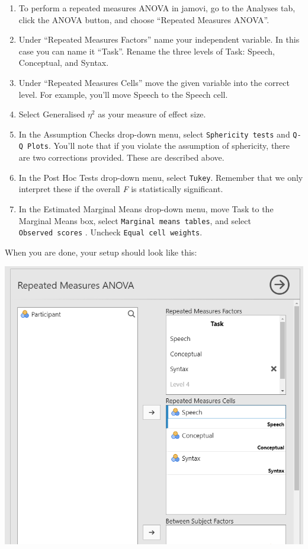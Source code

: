 \documentclass[
]{book}
\begin{document}
\begin{enumerate}
\def\labelenumi{\arabic{enumi}.}
\item
  To perform a repeated measures ANOVA in jamovi, go to the Analyses tab, click the ANOVA button, and choose ``Repeated Measures ANOVA''.
\item
  Under ``Repeated Measures Factors'' name your independent variable. In this case you can name it ``Task''. Rename the three levels of Task: Speech, Conceptual, and Syntax.
\item
  Under ``Repeated Measures Cells'' move the given variable into the correct level. For example, you'll move Speech to the Speech cell.
\item
  Select Generalised \(\eta^2\) as your measure of effect size.
\item
  In the Assumption Checks drop-down menu, select \texttt{Sphericity\ tests} and \texttt{Q-Q\ Plots}. You'll note that if you violate the assumption of sphericity, there are two corrections provided. These are described above.
\item
  In the Post Hoc Tests drop-down menu, select \texttt{Tukey}. Remember that we only interpret these if the overall \emph{F} is statistically significant.
\item
  In the Estimated Marginal Means drop-down menu, move Task to the Marginal Means box, select \texttt{Marginal\ means\ tables}, and select \texttt{Observed\ scores} . Uncheck \texttt{Equal\ cell\ weights}.
\end{enumerate}

When you are done, your setup should look like this:

\includegraphics{images/05-repeated-measures-anova/rm-anova_setup1.png}
\end{document}
